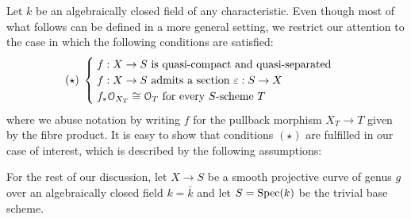 	Let $k$ be an algebraically closed field of any characteristic. Even though most of what follows can be defined in a more general setting, we restrict our attention to the case in which the following conditions are satisfied:
	$$
		(\star)\;
		\begin{cases}
			\; f:X\to S \text{ is quasi-compact and quasi-separated } \\
			\; f:X\to S \text{ admits a section } \varepsilon:S\to X \\			
			\; f_*\mathcal{O}_{X_T} \cong \mathcal{O}_T \text{ for every $S$-scheme } T \\			
		\end{cases}
	$$
	where we abuse notation by writing $f$ for the pullback morphism $X_T\to T$ given by the fibre product. It is easy to show that conditions $(\star)$ are fulfilled in our case of interest, which is described by the following assumptions:
	\begin{assumption}
		For the rest of our discussion, let $X\to S$ be a smooth projective curve of genus $g$ over an algebraically closed field $k=\bar{k}$ and let $S=\operatorname{Spec}(k)$ be the trivial base scheme.
	\end{assumption}


